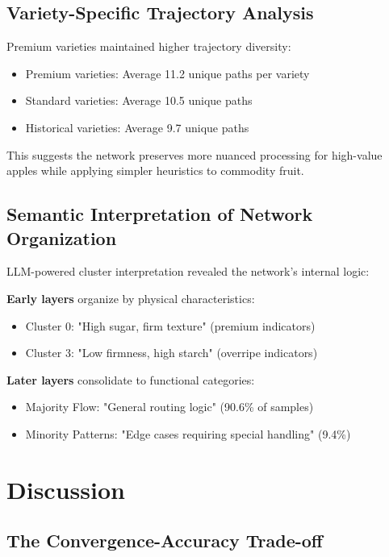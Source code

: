 \documentclass[11pt,a4paper]{article}
\begin{document}
\subsection{Variety-Specific Trajectory Analysis}

Premium varieties maintained higher trajectory diversity:
\begin{itemize}
    \item Premium varieties: Average 11.2 unique paths per variety
    \item Standard varieties: Average 10.5 unique paths
    \item Historical varieties: Average 9.7 unique paths  
\end{itemize}

This suggests the network preserves more nuanced processing for high-value apples while applying simpler heuristics to commodity fruit.

\subsection{Semantic Interpretation of Network Organization}

LLM-powered cluster interpretation revealed the network's internal logic:

\textbf{Early layers} organize by physical characteristics:
\begin{itemize}
    \item Cluster 0: "High sugar, firm texture" (premium indicators)
    \item Cluster 3: "Low firmness, high starch" (overripe indicators)
\end{itemize}

\textbf{Later layers} consolidate to functional categories:
\begin{itemize}
    \item Majority Flow: "General routing logic" (90.6\% of samples)
    \item Minority Patterns: "Edge cases requiring special handling" (9.4\%)
\end{itemize}

\section{Discussion}

\subsection{The Convergence-Accuracy Trade-off}
\end{document}
